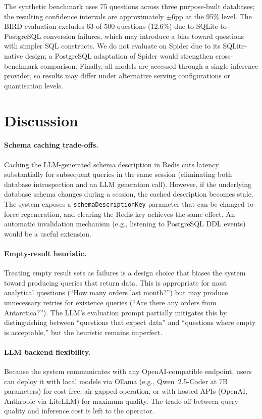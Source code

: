\documentclass{article}
\begin{document}
The synthetic benchmark uses 75 questions across three purpose-built databases; the resulting confidence intervals are approximately $\pm$6pp at the 95\% level. The BIRD evaluation excludes 63 of 500 questions (12.6\%) due to SQLite-to-PostgreSQL conversion failures, which may introduce a bias toward questions with simpler SQL constructs. We do not evaluate on Spider due to its SQLite-native design; a PostgreSQL adaptation of Spider would strengthen cross-benchmark comparison. Finally, all models are accessed through a single inference provider, so results may differ under alternative serving configurations or quantisation levels.


\section{Discussion}
\label{sec:discussion}

\paragraph{Schema caching trade-offs.} Caching the LLM-generated schema description in Redis cuts latency substantially for subsequent queries in the same session (eliminating both database introspection and an LLM generation call). However, if the underlying database schema changes during a session, the cached description becomes stale. The system exposes a \texttt{schemaDescriptionKey} parameter that can be changed to force regeneration, and clearing the Redis key achieves the same effect. An automatic invalidation mechanism (e.g., listening to PostgreSQL DDL events) would be a useful extension.

\paragraph{Empty-result heuristic.} Treating empty result sets as failures is a design choice that biases the system toward producing queries that return data. This is appropriate for most analytical questions (``How many orders last month?'') but may produce unnecessary retries for existence queries (``Are there any orders from Antarctica?''). The LLM's evaluation prompt partially mitigates this by distinguishing between ``questions that expect data'' and ``questions where empty is acceptable,'' but the heuristic remains imperfect.

\paragraph{LLM backend flexibility.} Because the system communicates with any OpenAI-compatible endpoint, users can deploy it with local models via Ollama (e.g., Qwen~2.5-Coder at 7B parameters) for cost-free, air-gapped operation, or with hosted APIs (OpenAI, Anthropic via LiteLLM) for maximum quality. The trade-off between query quality and inference cost is left to the operator.
\end{document}
